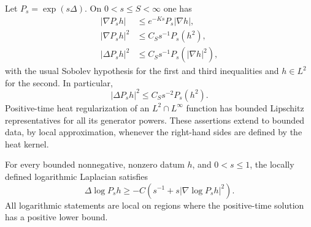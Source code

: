 \begin{lemma}
\label{heat:analytic-inputs}
Let \(P_s=\exp(s\Delta)\). On \(0<s\le S<\infty\) one has
\begin{align}
\label{heat:bakry-one}
|\nabla P_sh|&\le e^{-Ks}P_s|\nabla h|,\\
\label{heat:reverse-poincare}
|\nabla P_sh|^2&\le C_Ss^{-1}P_s(h^2),\\
\label{heat:laplacian-estimate}
|\Delta P_sh|^2&\le C_Ss^{-1}P_s(|\nabla h|^2),
\end{align}
with the usual Sobolev hypothesis for the first and third
inequalities and \(h\in L^2\) for the second. In particular,
\begin{equation}
\label{heat:laplacian-from-values}
|\Delta P_sh|^2\le C_Ss^{-2}P_s(h^2).
\end{equation}
Positive-time heat regularization of an \(L^2\cap L^\infty\)
function has bounded Lipschitz representatives for all its
generator powers. These assertions extend to bounded data, by
local approximation, whenever the right-hand sides are defined
by the heat kernel.

For every bounded nonnegative, nonzero datum \(h\), and
\(0<s\le1\), the locally defined logarithmic Laplacian satisfies
\begin{equation}
\label{heat:li-yau-consequence}
\Delta\log P_sh\ge
-C\left(s^{-1}+s|\nabla\log P_sh|^2\right).
\end{equation}
All logarithmic statements are local on regions where the
positive-time solution has a positive lower bound.
\end{lemma}

